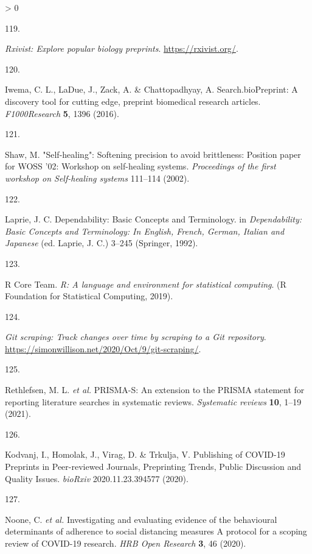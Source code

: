 \documentclass[a4paper, twoside]{templates/ociamthesis}
\newlength{\cslhangindent}
\newlength{\csllabelwidth}
\newenvironment{CSLReferences}[3] %
 {%
  \setlength{\parindent}{0pt}
  \ifodd #1 \everypar{\setlength{\hangindent}{\cslhangindent}}\ignorespaces\fi
  \ifnum #2 > 0
  \setlength{\parskip}{#2\baselineskip}
  \fi
 }%
 {}
\newcommand{\CSLLeftMargin}[1]{\parbox[t]{\maxof{\widthof{#1}}{\csllabelwidth}}{#1}}
\newcommand{\CSLRightInline}[1]{\parbox[t]{\linewidth - \csllabelwidth}{#1}}
\begin{document}
\begin{CSLReferences}{0}{0}
\leavevmode\hypertarget{ref-zotero-15027}{}%
\CSLLeftMargin{119. }
\CSLRightInline{\emph{Rxivist: Explore popular biology preprints}. \url{https://rxivist.org/}.}

\leavevmode\hypertarget{ref-iwema2016}{}%
\CSLLeftMargin{120. }
\CSLRightInline{Iwema, C. L., LaDue, J., Zack, A. \& Chattopadhyay, A. Search.{bioPreprint}: A discovery tool for cutting edge, preprint biomedical research articles. \emph{F1000Research} \textbf{5}, 1396 (2016).}

\leavevmode\hypertarget{ref-shaw2002}{}%
\CSLLeftMargin{121. }
\CSLRightInline{Shaw, M. "{Self}-healing": Softening precision to avoid brittleness: Position paper for {WOSS} '02: Workshop on self-healing systems. \emph{Proceedings of the first workshop on Self-healing systems} 111--114 (2002).}

\leavevmode\hypertarget{ref-laprie1992}{}%
\CSLLeftMargin{122. }
\CSLRightInline{Laprie, J. C. Dependability: Basic {Concepts} and {Terminology}. in \emph{Dependability: Basic {Concepts} and {Terminology}: In {English}, {French}, {German}, {Italian} and {Japanese}} (ed. Laprie, J. C.) 3--245 ({Springer}, 1992).}

\leavevmode\hypertarget{ref-rcoreteam2019}{}%
\CSLLeftMargin{123. }
\CSLRightInline{R Core Team. \emph{R: A language and environment for statistical computing}. ({R Foundation for Statistical Computing}, 2019).}

\leavevmode\hypertarget{ref-zotero-15031}{}%
\CSLLeftMargin{124. }
\CSLRightInline{\emph{Git scraping: Track changes over time by scraping to a {Git} repository}. \url{https://simonwillison.net/2020/Oct/9/git-scraping/}.}

\leavevmode\hypertarget{ref-rethlefsen2021prisma}{}%
\CSLLeftMargin{125. }
\CSLRightInline{Rethlefsen, M. L. \emph{et al.} {PRISMA}-{S}: An extension to the {PRISMA} statement for reporting literature searches in systematic reviews. \emph{Systematic reviews} \textbf{10}, 1--19 (2021).}

\leavevmode\hypertarget{ref-kodvanj2020}{}%
\CSLLeftMargin{126. }
\CSLRightInline{Kodvanj, I., Homolak, J., Virag, D. \& Trkulja, V. Publishing of {COVID}-19 {Preprints} in {Peer}-reviewed {Journals}, {Preprinting Trends}, {Public Discussion} and {Quality Issues}. \emph{bioRxiv} 2020.11.23.394577 (2020).}

\leavevmode\hypertarget{ref-noone2020}{}%
\CSLLeftMargin{127. }
\CSLRightInline{Noone, C. \emph{et al.} Investigating and evaluating evidence of the behavioural determinants of adherence to social distancing measures {} {A} protocol for a scoping review of {COVID}-19 research. \emph{HRB Open Research} \textbf{3}, 46 (2020).}


\end{CSLReferences}
\end{document}
